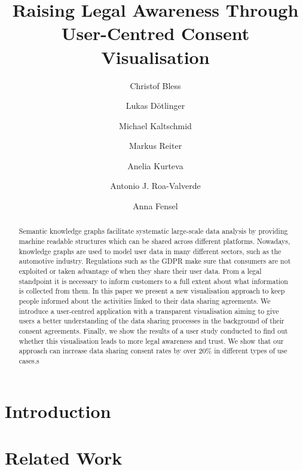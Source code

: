 \documentclass{llncs}
\title{Raising Legal Awareness Through User-Centred Consent Visualisation}
\author{Christof Bless \and Lukas Dötlinger \and Michael Kaltschmid \and Markus Reiter \and Anelia Kurteva \and Antonio J. Roa-Valverde \and Anna Fensel }
\institute{Institute of Computer Science, University of Innsbruck}
\begin{document}
\maketitle

\begin{abstract}
  Semantic knowledge graphs facilitate systematic large-scale data analysis by providing machine readable structures which can be shared across different platforms.
  Nowadays, knowledge graphs are used to model user data in many different sectors, such as the automotive industry. 
  Regulations such as the GDPR make sure that consumers
  are not exploited or taken advantage of when they share their user data.
  From a legal standpoint it is
  necessary to inform customers to a full extent about what information is
  collected from them. In this paper we present a new visualisation approach
  to keep people informed about the activities linked to their data sharing
  agreements. We introduce a user-centred application with a transparent
  visualisation aiming to give users a better understanding of the data sharing
  processes in the background of their consent agreements. Finally, we show
  the results of a user study conducted to find out whether this
  visualisation leads to more legal awareness and trust.
  We show that our approach can increase data sharing consent rates by over 20\% in different types of use cases.s
\end{abstract}


\section{Introduction}
\label{sec:introduction}


\section{Related Work}
\label{sec:related_work}

\end{document}
